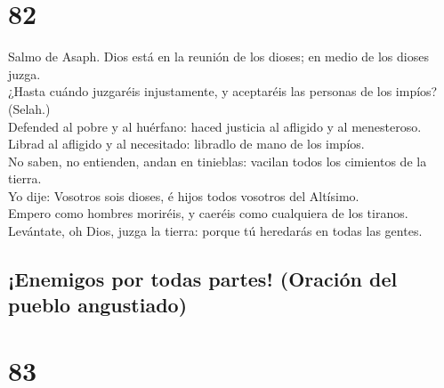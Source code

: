 \hypertarget{section-81}{%
\section{82}\label{section-81}}

 Salmo de Asaph. Dios está en la reunión de los dioses; en
medio de los dioses juzga.\\
 ¿Hasta cuándo juzgaréis injustamente, y aceptaréis las
personas de los impíos? (Selah.)\\
 Defended al pobre y al huérfano: haced justicia al
afligido y al menesteroso.\\
 Librad al afligido y al necesitado: libradlo de mano de
los impíos.\\
 No saben, no entienden, andan en tinieblas: vacilan todos
los cimientos de la tierra.\\
 Yo dije: Vosotros sois dioses, é hijos todos vosotros del
Altísimo.\\
 Empero como hombres moriréis, y caeréis como cualquiera
de los tiranos.\\
 Levántate, oh Dios, juzga la tierra: porque tú heredarás
en todas las gentes.

\hypertarget{enemigos-por-todas-partes-oraciuxf3n-del-pueblo-angustiado}{%
\subsection{¡Enemigos por todas partes! (Oración del pueblo
angustiado)}\label{enemigos-por-todas-partes-oraciuxf3n-del-pueblo-angustiado}}

\hypertarget{section-82}{%
\section{83}\label{section-82}}

